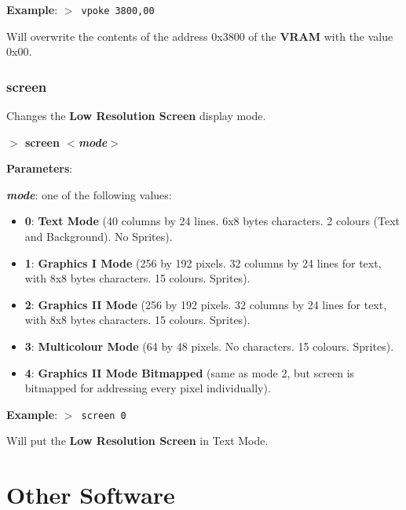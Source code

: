 \documentclass[a4paper,11pt]{article}
\begin{document}
        \textbf{Example}: \texttt{$>$ vpoke 3800,00}

        Will overwrite the contents of the address 0x3800 of the \textbf{VRAM}
        with the value 0x00.

        \subsubsection{{\color{blue}screen}}
        Changes the \textbf{Low Resolution Screen} display mode.

        \hspace{1.9cm}\textbf{$>$ screen \textit{$<$mode$>$}}

        \textbf{Parameters}:

        \hspace{1cm}\textbf{\textit{mode}}: one of the following values:

        \begin{itemize}
            \item \textbf{0}: \textbf{Text Mode} (40 columns by 24 lines. 6x8 bytes
            characters. 2 colours (Text and Background). No Sprites).
            \item \textbf{1}: \textbf{Graphics I Mode} (256 by 192 pixels. 32 columns by
            24 lines for text, with 8x8 bytes characters. 15 colours. Sprites).
            \item \textbf{2}: \textbf{Graphics II Mode} (256 by 192 pixels. 32 columns by
            24 lines for text, with 8x8 bytes characters. 15 colours. Sprites).
            \item \textbf{3}: \textbf{Multicolour Mode} (64 by 48 pixels. No characters.
            15 colours. Sprites).
            \item \textbf{4}: \textbf{Graphics II Mode Bitmapped} (same as mode 2, but
            screen is bitmapped for addressing every pixel individually).
        \end{itemize}
        
        \textbf{Example}: \texttt{$>$ screen 0}

        Will put the \textbf{Low Resolution Screen} in Text Mode.

    \pagebreak
    \section{Other Software}
\end{document}
